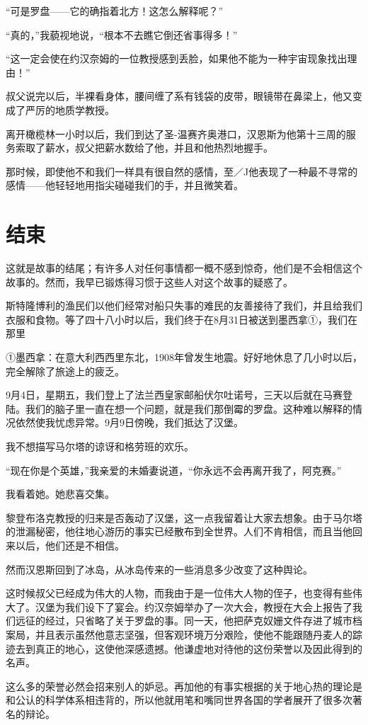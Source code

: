 \documentclass[10pt]{book}
\begin{document}
“可是罗盘——它的确指着北方！这怎么解释呢？”

“真的，”我藐视地说，“根本不去瞧它倒还省事得多！”

“这一定会使在约汉奈姆的一位教授感到丢脸，如果他不能为一种宇宙现象找出理由！”

叔父说完以后，半裸看身体，腰间缠了系有钱袋的皮带，眼镜带在鼻梁上，他又变成了严厉的地质学教授。

离开橄榄林一小时以后，我们到达了圣-温赛齐奥港口，汉恩斯为他第十三周的服务索取了薪水，叔父把薪水数给了他，并且和他热烈地握手。

那时候，即使他不和我们一样具有很自然的感情，至／J他表现了一种最不寻常的感情——他轻轻地用指尖碰碰我们的手，并且微笑着。
\chapter{结束}
这就是故事的结尾；有许多人对任何事情都一概不感到惊奇，他们是不会相信这个故事的。然而，我早已锻炼得习惯于这些人对这个故事的疑惑了。

斯特隆博利的渔民们以他们经常对船只失事的难民的友善接待了我们，并且给我们衣服和食物。等了四十八小时以后，我们终于在8月31日被送到墨西拿①，我们在那里

①墨西拿：在意大利西西里东北，1908年曾发生地震。好好地休息了几小时以后，完全解除了旅途上的疲乏。

9月4日，星期五，我们登上了法兰西皇家邮船伏尔吐诺号，三天以后就在马赛登陆。我们的脑子里一直在想一个问题，就是我们那倒霉的罗盘。这种难以解释的情况依然使我忧虑异常。9月9日傍晚，我们抵达了汉堡。

我不想描写马尔塔的谅讶和格劳班的欢乐。

“现在你是个英雄，”我亲爱的未婚妻说道，“你永远不会再离开我了，阿克赛。”

我看着她。她悲喜交集。

黎登布洛克教授的归来是否轰动了汉堡，这一点我留着让大家去想象。由于马尔塔的泄漏秘密，他往地心游历的事实已经散布到全世界。人们不肯相信，而且当他回来以后，他们还是不相信。

然而汉恩斯回到了冰岛，从冰岛传来的一些消息多少改变了这种舆论。

这时候叔父已经成为伟大的人物，而我由于是一位伟大人物的侄子，也变得有些伟大了。汉堡为我们设下了宴会。约汉奈姆举办了一次大会，教授在大会上报告了我们远征的经过，只省略了关于罗盘的事。同一天，他把萨克奴姗文件存进了城市档案局，并且表示虽然他意志坚强，但客观环境万分艰险，使他不能跟随丹麦人的踪迹去到真正的地心，这使他深感遗撼。他谦虚地对待他的这份荣誉以及因此得到的名声。

这么多的荣誉必然会招来别人的妒忌。再加他的有事实根据的关于地心热的理论是和公认的科学体系相违背的，所以他就用笔和嘴同世界各国的学者展开了很多次著名的辩论。
\end{document}
